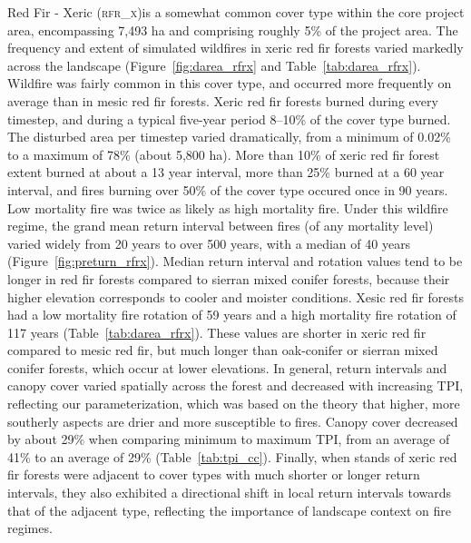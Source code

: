Red Fir - Xeric (\textsc{rfr\_x})is a somewhat common cover type within the core project area, encompassing 7,493 ha and comprising roughly 5\% of the project area. The frequency and extent of simulated wildfires in xeric red fir forests varied markedly across the landscape (Figure~\ref{fig:darea_rfrx} and Table~\ref{tab:darea_rfrx}). %
%
Wildfire was fairly common in this cover type, and occurred more frequently on average than in mesic red fir forests. Xeric red fir forests burned during every timestep, and during a typical five-year period 8--10\% of the cover type burned. The disturbed area per timestep varied dramatically, from a minimum of 0.02\% to a maximum of 78\% (about 5,800 ha). More than 10\% of xeric red fir forest extent burned at about a 13 year interval, more than 25\% burned at a 60 year interval, and fires burning over 50\% of the cover type occured once in 90 years. Low mortality fire was twice as likely as high mortality fire. %
%
Under this wildfire regime, the grand mean return interval between fires (of any mortality level) varied widely from 20 years to over 500 years, with a median of 40 years (Figure~\ref{fig:preturn_rfrx}). Median return interval and rotation values tend to be longer in red fir forests compared to sierran mixed conifer forests, because their higher elevation corresponds to cooler and moister conditions. Xesic red fir forests had a low mortality fire rotation of 59 years and a high mortality fire rotation of 117 years (Table~\ref{tab:darea_rfrx}). These values are shorter in xeric red fir compared to mesic red fir, but much longer than oak-conifer or sierran mixed conifer forests, which occur at lower elevations. %
%
In general, return intervals and canopy cover varied spatially across the forest and decreased with increasing TPI, reflecting our parameterization, which was based on the theory that higher, more southerly aspects are drier and more susceptible to fires. Canopy cover decreased by about 29\% when comparing minimum to maximum TPI, from an average of 41\% to an average of 29\% (Table~\ref{tab:tpi_cc}). %
%
Finally, when stands of xeric red fir forests were adjacent to cover types with much shorter or longer return intervals, they also exhibited a directional shift in local return intervals towards that of the adjacent type, reflecting the importance of landscape context on fire regimes.

